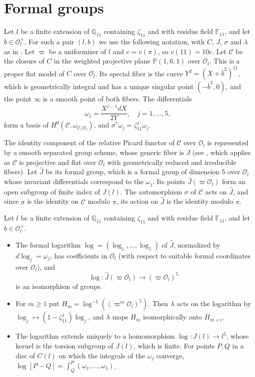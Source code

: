 \documentclass[11pt,reqno]{amsart}
\newcommand{\Q}{\mathbb{Q}}
\newcommand{\F}{\mathbb{F}}
\newcommand{\PP}{\mathbb{P}}
\newcommand{\OO}{\mathcal{O}}
\newcommand{\Jhat}{\widehat{J}}
\theoremstyle{definition}
\numberwithin{equation}{section}
\begin{document}
\section{Formal groups}\label{sec:formal}

Let $l$ be a finite extension of $\Q_{11}$ containing $\zeta_{11}$ and with residue field $\F_{11}$, and let $b\in\OO_l^\times$. For such a pair $(l,b)$ we use the following notation, with $C$, $J$, $\sigma$ and $\lambda$ as in . Let $\varpi$ be a uniformizer of $l$ and $e=v(\pi)$, so $v(11)=10e$. Let $\mathcal C$ be the closure of $C$ in the weighted projective plane $\PP(1,6,1)$ over $\OO_l$. This is a proper flat model of $C$ over $\OO_l$. Its special fiber is the curve $Y^2=(X+\overline b^2)^{11}$, which is geometrically integral and has a unique singular point $(-\overline b^2,0)$, and the point $\infty$ is a smooth point of both fibers. The differentials
$$\omega_j=\frac{X^{j-1}dX}{2Y},\quad j=1,\ldots,5,$$
form a basis of $H^0(\mathcal C,\omega_{\mathcal C/\OO_l})$, and $\sigma^*\omega_j=\zeta_{11}^j\omega_j$.

The identity component of the relative Picard functor of $\mathcal C$ over $\OO_l$ is represented by a smooth separated group scheme, whose generic fiber is $J$ (see \cite[9.3/1]{BLR90}, which applies as $\mathcal C$ is projective and flat over $\OO_l$ with geometrically reduced and irreducible fibers). Let $\Jhat$ be its formal group, which is a formal group of dimension $5$ over $\OO_l$ whose invariant differentials correspond to the $\omega_j$. Its points $\Jhat(\varpi\OO_l)$ form an open subgroup of finite index of $J(l)$. The automorphism $\sigma$ of $\mathcal C$ acts on $\Jhat$, and since $\sigma$ is the identity on $\mathcal C$ modulo $\pi$, its action on $\Jhat$ is the identity modulo $\pi$.

\begin{lemma}\label{lem:log}
Let $l$ be a finite extension of $\Q_{11}$ containing $\zeta_{11}$ and with residue field $\F_{11}$, and let $b\in\OO_l^\times$.
\begin{itemize}
\item[a)] The formal logarithm $\log=(\log_1,\ldots,\log_5)$ of $\Jhat$, normalized by $d\log_j=\omega_j$, has coefficients in $\OO_l$ (with respect to suitable formal coordinates over $\OO_l$), and
$$\log\colon \Jhat(\varpi\OO_l)\rightarrow (\varpi\OO_l)^5$$
is an isomorphism of groups.
\item[b)] For $m\geq 1$ put $H_m=\log^{-1}((\varpi^m\OO_l)^5)$. Then $\lambda$ acts on the logarithm by $\log_j\mapsto (1-\zeta_{11}^j)\log_j$, and $\lambda$ maps $H_m$ isomorphically onto $H_{m+e}$.
\item[c)] The logarithm extends uniquely to a homomorphism $\log\colon J(l)\rightarrow l^5$, whose kernel is the torsion subgroup of $J(l)$, which is finite. For points $P,Q$ in a disc of $C(l)$ on which the integrals of the $\omega_j$ converge, $\log[P-Q]=\int_Q^P(\omega_1,\ldots,\omega_5)$.
\end{itemize}
\end{lemma}
\end{document}
